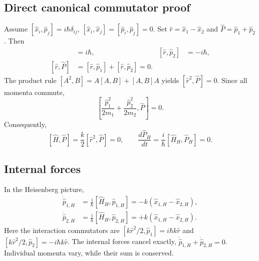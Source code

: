 \documentclass[11pt,a4paper]{article}
\theoremstyle{definition}
\begin{document}
\subsection{Direct canonical commutator proof}
Assume \([\hat x_i,\hat p_j]=i\hbar\delta_{ij}\), \([\hat x_i,\hat x_j]=[\hat p_i,\hat p_j]=0\). Set \(\hat r=\hat x_1-\hat x_2\) and \(\hat P=\hat p_1+\hat p_2\). Then
\begin{align}
[\hat r,\hat p_1]&=i\hbar,& [\hat r,\hat p_2]&=-i\hbar,\\
[\hat r,\hat P]&=[\hat r,\hat p_1]+[\hat r,\hat p_2]=0.
\end{align}
The product rule \([A^2,B]=A[A,B]+[A,B]A\) yields \([\hat r^2,\hat P]=0\). Since all momenta commute,
\begin{equation}
\left[\frac{\hat p_1^2}{2m_1}+\frac{\hat p_2^2}{2m_2},\hat P\right]=0.
\end{equation}
Consequently,
\begin{equation}
\boxed{[\hat H,\hat P]=\frac{k}{2}[\hat r^2,\hat P]=0,\qquad
\frac{d\hat P_H}{dt}=\frac{i}{\hbar}[\hat H_H,\hat P_H]=0.}
\label{eq:2particle-conserve}
\end{equation}
\subsection{Internal forces}
In the Heisenberg picture,
\begin{align}
\dot{\hat p}_{1,H}&=\frac{i}{\hbar}[\hat H_H,\hat p_{1,H}]=-k(\hat x_{1,H}-\hat x_{2,H}),\\
\dot{\hat p}_{2,H}&=\frac{i}{\hbar}[\hat H_H,\hat p_{2,H}]=+k(\hat x_{1,H}-\hat x_{2,H}).
\end{align}
Here the interaction commutators are \([k\hat r^2/2,\hat p_1]=i\hbar k\hat r\) and \([k\hat r^2/2,\hat p_2]=-i\hbar k\hat r\). The internal forces cancel exactly, \(\dot{\hat p}_{1,H}+\dot{\hat p}_{2,H}=0\). Individual momenta vary, while their sum is conserved.
\end{document}
